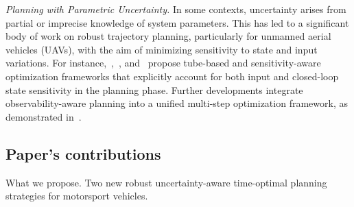 \textit{Planning with Parametric Uncertainty.} In some contexts, uncertainty arises from partial or imprecise knowledge of system parameters. This has led to a significant body of work on robust trajectory planning, particularly for unmanned aerial vehicles (UAVs), with the aim of minimizing sensitivity to state and input variations. For instance,~\cite{Brault:RobustTrajectoryPlanning:2021},~\cite{Giordano:TrajectoryGenerationMinimum:2018}, and~\cite{Brault:TubebasedTrajectoryOptimization:} propose tube-based and sensitivity-aware optimization frameworks that explicitly account for both input and closed-loop state sensitivity in the planning phase. Further developments integrate observability-aware planning into a unified multi-step optimization framework, as demonstrated in~\cite{Bohm:COPControlObservabilityaware:2022}.


 
\subsection{Paper's contributions}
What we propose. Two new robust uncertainty-aware time-optimal planning strategies for motorsport vehicles.  
